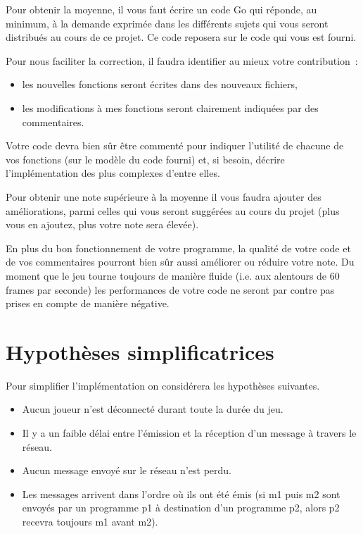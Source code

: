\documentclass[a4paper]{article}
\begin{document}
Pour obtenir la moyenne, il vous faut écrire un code Go qui réponde, au minimum, à la demande exprimée dans les différents sujets qui vous seront distribués au cours de ce projet.
Ce code reposera sur le code qui vous est fourni.

Pour nous faciliter la correction, il faudra identifier au mieux votre contribution~:
\begin{itemize}
  \item les nouvelles fonctions seront écrites dans des nouveaux fichiers,
  \item les modifications à mes fonctions seront clairement indiquées par des commentaires.
\end{itemize}
Votre code devra bien sûr être commenté pour indiquer l'utilité de chacune de vos fonctions (sur le modèle du code fourni) et, si besoin, décrire l'implémentation des plus complexes d'entre elles.

Pour obtenir une note supérieure à la moyenne il vous faudra ajouter des améliorations, parmi celles qui vous seront suggérées au cours du projet (plus vous en ajoutez, plus votre note sera élevée).

En plus du bon fonctionnement de votre programme, la qualité de votre code et de vos commentaires pourront bien sûr aussi améliorer ou réduire votre note. Du moment que le jeu tourne toujours de manière fluide (i.e. aux alentours de 60 frames par seconde) les performances de votre code ne seront par contre pas prises en compte de manière négative.

\section{Hypothèses simplificatrices}

Pour simplifier l'implémentation on considérera les hypothèses suivantes.

\begin{itemize}
\item Aucun joueur n'est déconnecté durant toute la durée du jeu.
\item Il y a un faible délai entre l'émission et la réception d'un message à travers le réseau.
\item Aucun message envoyé sur le réseau n'est perdu.
\item Les messages arrivent dans l'ordre où ils ont été émis (si m1 puis m2 sont envoyés par un programme p1 à destination d'un programme p2, alors p2 recevra toujours m1 avant m2).
\end{itemize}
\end{document}
